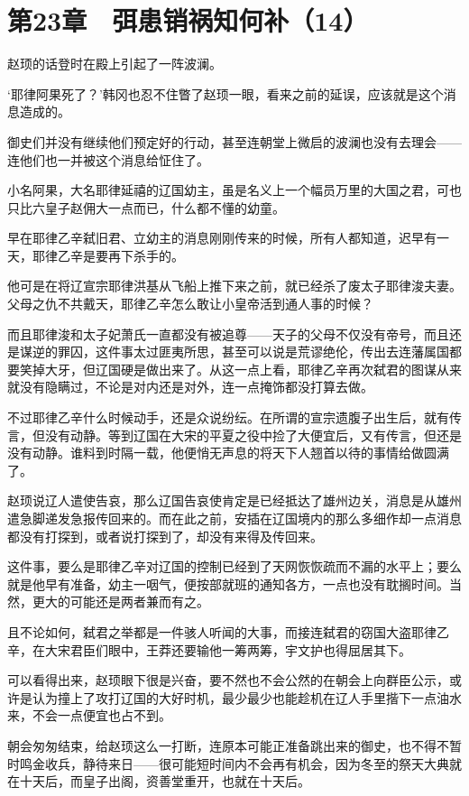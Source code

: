 \section{第23章　弭患销祸知何补（14）}

赵顼的话登时在殿上引起了一阵波澜。 

‘耶律阿果死了？’韩冈也忍不住瞥了赵顼一眼，看来之前的延误，应该就是这个消息造成的。 

御史们并没有继续他们预定好的行动，甚至连朝堂上微启的波澜也没有去理会——连他们也一并被这个消息给怔住了。 

小名阿果，大名耶律延禧的辽国幼主，虽是名义上一个幅员万里的大国之君，可也只比六皇子赵佣大一点而已，什么都不懂的幼童。 

早在耶律乙辛弑旧君、立幼主的消息刚刚传来的时候，所有人都知道，迟早有一天，耶律乙辛是要再下杀手的。 

他可是在将辽宣宗耶律洪基从飞船上推下来之前，就已经杀了废太子耶律浚夫妻。父母之仇不共戴天，耶律乙辛怎么敢让小皇帝活到通人事的时候？ 

而且耶律浚和太子妃萧氏一直都没有被追尊——天子的父母不仅没有帝号，而且还是谋逆的罪囚，这件事太过匪夷所思，甚至可以说是荒谬绝伦，传出去连藩属国都要笑掉大牙，但辽国硬是做出来了。从这一点上看，耶律乙辛再次弑君的图谋从来就没有隐瞒过，不论是对内还是对外，连一点掩饰都没打算去做。 

不过耶律乙辛什么时候动手，还是众说纷纭。在所谓的宣宗遗腹子出生后，就有传言，但没有动静。等到辽国在大宋的平夏之役中捡了大便宜后，又有传言，但还是没有动静。谁料到时隔一载，他便悄无声息的将天下人翘首以待的事情给做圆满了。 

赵顼说辽人遣使告哀，那么辽国告哀使肯定是已经抵达了雄州边关，消息是从雄州遣急脚递发急报传回来的。而在此之前，安插在辽国境内的那么多细作却一点消息都没有打探到，或者说打探到了，却没有来得及传回来。 

这件事，要么是耶律乙辛对辽国的控制已经到了天网恢恢疏而不漏的水平上；要么就是他早有准备，幼主一咽气，便按部就班的通知各方，一点也没有耽搁时间。当然，更大的可能还是两者兼而有之。 

且不论如何，弑君之举都是一件骇人听闻的大事，而接连弑君的窃国大盗耶律乙辛，在大宋君臣们眼中，王莽还要输他一筹两筹，宇文护也得屈居其下。 

可以看得出来，赵顼眼下很是兴奋，要不然也不会公然的在朝会上向群臣公示，或许是认为撞上了攻打辽国的大好时机，最少最少也能趁机在辽人手里揩下一点油水来，不会一点便宜也占不到。 

朝会匆匆结束，给赵顼这么一打断，连原本可能正准备跳出来的御史，也不得不暂时鸣金收兵，静待来日——很可能短时间内不会再有机会，因为冬至的祭天大典就在十天后，而皇子出阁，资善堂重开，也就在十天后。 

